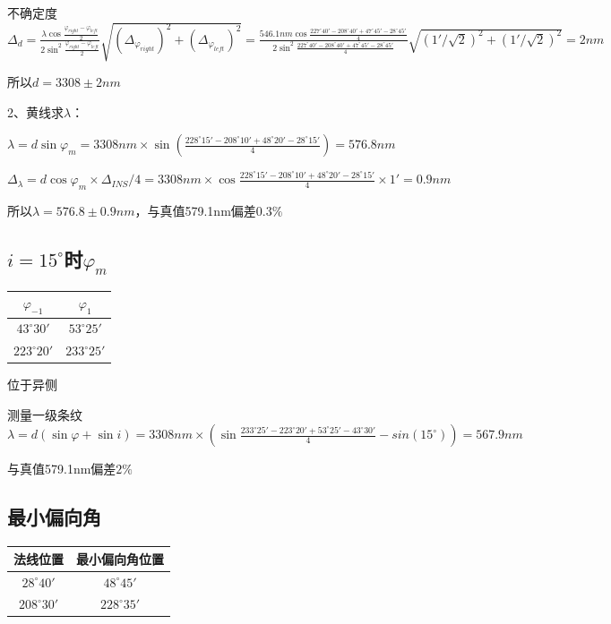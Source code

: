 \documentclass{ctexart}
\begin{document}
    不确定度$\Delta_{d} = \frac{\lambda \cos\frac{\varphi_{right}-\varphi_{left}}{2}}{2\sin^{2}\frac{\varphi_{right}-\varphi_{left}}{2}}  \sqrt{(\Delta_{\varphi_{right}})^2+(\Delta_{\varphi_{left}})^2}
    =\frac{546.1nm \cos\frac{227^{\circ}40'-208^{\circ}40'+47^{\circ}45'-28^{\circ}45'}{4}}{2\sin^{2}\frac{227^{\circ}40'-208^{\circ}40'+47^{\circ}45'-28^{\circ}45'}{4}}  \sqrt{(1'/\sqrt{2})^2+(1'/\sqrt{2})^2}                   
    =2nm$

    所以$d = 3308 \pm 2 nm$

    2、黄线求$\lambda$：

    $\lambda=d \sin{\varphi_m} 
       =3308nm \times \sin(\frac{228^{\circ}15'-208^{\circ}10'+48^{\circ}20'-28^{\circ}15'}{4})
       =576.8nm$

    $\Delta_{\lambda} = d \cos \varphi_m \times \Delta_{INS} /4
      =3308nm \times \cos \frac{228^{\circ}15'-208^{\circ}10'+48^{\circ}20'-28^{\circ}15'}{4} \times 1'
      =0.9nm$

    所以$\lambda = 576.8 \pm 0.9 nm$，与真值579.1nm偏差$0.3 \%$

  \subsection{$i=15^{\circ}$时$\varphi_m$}
  \begin{table}[h]
    \centering
    \begin{tabular}{c|c}
      \hline
      $\varphi_{-1}$ & $\varphi_{1}$ \\
      \hline
      $43^{\circ}30'$&$53^{\circ}25'$\\
      \hline
      $223^{\circ}20'$&$233^{\circ}25'$\\
    \end{tabular}
  \end{table}
  位于异侧

  测量一级条纹
  $\lambda=d (\sin{\varphi} + \sin{i}) 
  =3308nm \times (\sin \frac{233^{\circ}25'-223^{\circ}20'+53^{\circ}25'-43^{\circ}30'}{4}-sin(15^{\circ}))
  =567.9nm$

  与真值579.1nm偏差$2 \%$
  \subsection{最小偏向角}
  \begin{table}[h]
    \centering
    \begin{tabular}{c|c}
      \hline
      法线位置 & 最小偏向角位置 \\
      \hline
      $28^{\circ}40'$&$48^{\circ}45'$\\
      \hline
      $208^{\circ}30'$&$228^{\circ}35'$\\
    \end{tabular}
  \end{table}
\end{document}
